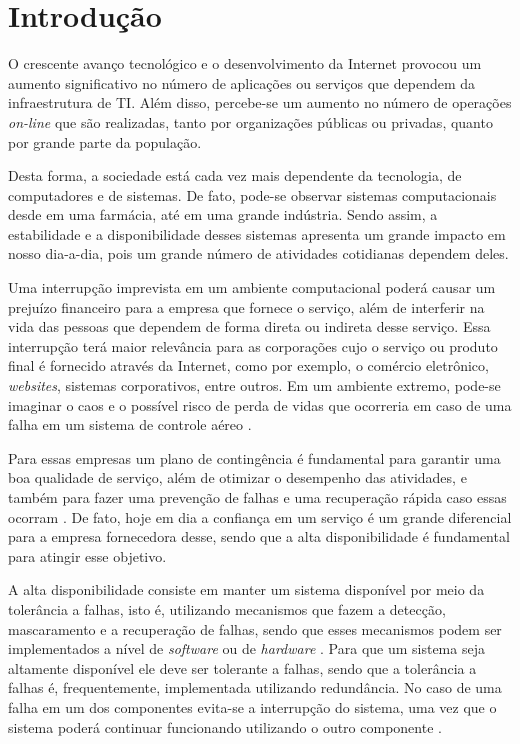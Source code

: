 \chapter{Introdução}
\label{cap:introducao}
O crescente avanço tecnológico e o desenvolvimento da Internet provocou um aumento significativo no número de aplicações ou serviços que 
dependem da infraestrutura de \ac{TI}. Além disso, percebe-se um aumento no número de operações \textit{on-line} que são realizadas, 
tanto por organizações públicas ou privadas, quanto por grande parte da população.

Desta forma, a sociedade está cada vez mais dependente da tecnologia, de computadores e de sistemas. De fato, pode-se observar 
sistemas computacionais desde em uma farmácia, até em uma grande indústria. Sendo assim, a estabilidade e a disponibilidade desses 
sistemas apresenta um grande impacto em nosso dia-a-dia, pois um grande número de atividades cotidianas dependem deles.

Uma interrupção imprevista em um ambiente computacional poderá causar um prejuízo financeiro para a empresa que fornece o serviço, 
além de interferir na vida das pessoas que dependem de forma direta ou indireta desse serviço. 
Essa interrupção terá maior relevância para as corporações cujo o serviço ou produto final é fornecido através da Internet, 
como por exemplo, o comércio eletrônico, \textit{websites}, sistemas corporativos, entre outros. 
Em um ambiente extremo, pode-se imaginar o caos e o possível risco de perda de vidas que ocorreria em caso de uma falha 
em um sistema de controle aéreo \cite{costa2009}.

Para essas empresas um plano de contingência é fundamental para garantir uma boa qualidade de serviço, além de otimizar o desempenho 
das atividades, e também para fazer uma prevenção de falhas e uma recuperação rápida caso essas ocorram \cite{costa2009}.
De fato, hoje em dia a confiança em um serviço é um grande diferencial para a empresa fornecedora desse, 
sendo que a alta disponibilidade é fundamental para atingir esse objetivo.

A alta disponibilidade consiste em manter um sistema disponível por meio da tolerância a falhas, isto é, utilizando mecanismos que fazem a 
detecção, mascaramento e a recuperação de falhas, sendo que esses mecanismos podem ser implementados a nível de \textit{software} ou de 
\textit{hardware} \cite{reis2009}. Para que um sistema seja altamente disponível ele deve ser tolerante a falhas, sendo que a tolerância
a falhas é, frequentemente, implementada utilizando redundância. No caso de uma falha em um dos componentes evita-se a interrupção do sistema,
uma vez que o sistema poderá continuar funcionando utilizando o outro componente \cite{batista2007}.

